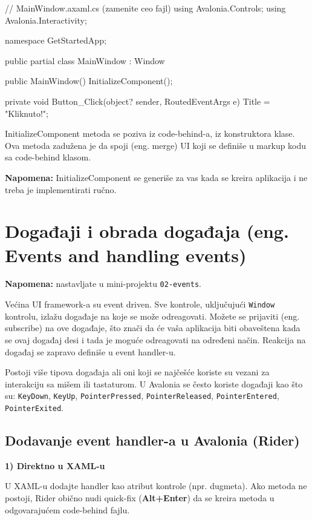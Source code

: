 \documentclass[11pt,a4paper]{article}
\begin{document}
\begin{CodeBlock}
// MainWindow.axaml.cs (zamenite ceo fajl)
using Avalonia.Controls;
using Avalonia.Interactivity;

namespace GetStartedApp;

public partial class MainWindow : Window
{
    public MainWindow()
    {
        InitializeComponent();
    }

    private void Button_Click(object? sender, RoutedEventArgs e)
    {
        Title = "Kliknuto!";
    }
}
\end{CodeBlock}

InitializeComponent metoda se poziva iz code-behind-a, iz konstruktora klase. Ova metoda zadužena je da spoji (eng. merge) UI koji se definiše u markup kodu sa code-behind klasom.

\textbf{Napomena:} InitializeComponent se generiše za vas kada se kreira aplikacija i ne treba je implementirati ručno.

\section{Događaji i obrada događaja (eng. Events and handling events)}

\textbf{Napomena:} nastavljate u mini-projektu \texttt{02-events}.

Većina UI framework-a su event driven. Sve kontrole, uključujući \texttt{Window} kontrolu, izlažu događaje na koje se može odreagovati. Možete se prijaviti (eng. subscribe) na ove događaje, što znači da će vaša aplikacija biti obaveštena kada se ovaj događaj desi i tada je moguće odreagovati na određeni način. Reakcija na događaj se zapravo definiše u event handler-u.

Postoji više tipova događaja ali oni koji se najčešće koriste su vezani za interakciju sa mišem ili tastaturom. U Avalonia se često koriste događaji kao što su: \texttt{KeyDown}, \texttt{KeyUp}, \texttt{PointerPressed}, \texttt{PointerReleased}, \texttt{PointerEntered}, \texttt{PointerExited}.

\subsection{Dodavanje event handler-a u Avalonia (Rider)}

\textbf{1) Direktno u XAML-u}

U XAML-u dodajte handler kao atribut kontrole (npr. dugmeta). Ako metoda ne postoji, Rider obično nudi quick-fix (\textbf{Alt+Enter}) da se kreira metoda u odgovarajućem code-behind fajlu.
\end{document}
